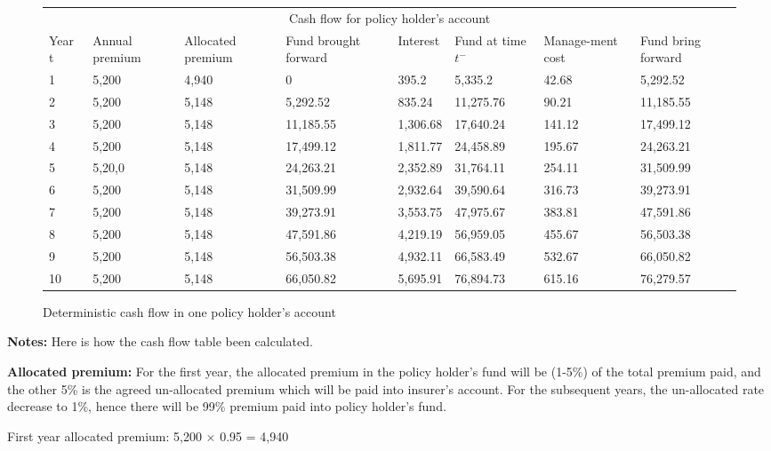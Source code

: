 \documentclass{report}
\begin{document}
\begin{figure}[H]
    \centering
\begin{tabular}{p{1cm} p{1.5cm} p{1.5cm} p{2cm} p{1.5cm} p{2cm} p{1.5cm} p{1.5cm} }
\toprule
\multicolumn{8}{c}{Cash flow for policy holder's account} \\
\cmidrule(r){3-7}

Year t & Annual premium & Allocated premium & Fund brought forward & Interest & Fund at time $t^-$ & Manage-ment cost & Fund bring forward \\
\midrule
1	&5,200	&4,940	&0&	395.2	&5,335.2	&42.68	&5,292.52\\
2	&5,200	&5,148	&5,292.52	 &   835.24	&11,275.76 &	90.21	&11,185.55\\
3	&5,200	&5,148	&11,185.55&  1,306.68	&17,640.24	&141.12  &17,499.12\\
4&	5,200	&5,148	&17,499.12&  1,811.77&	24,458.89	&    195.67       &24,263.21\\
5&	5,20,0	&5,148&	24,263.21	&    2,352.89&	31,764.11	&   254.11	&31,509.99\\
6&	5,200	&5,148&	31,509.99	&   2,932.64&	39,590.64	&   316.73	&39,273.91\\
7&	5,200	&5,148&	39,273.91	&   3,553.75&	47,975.67	&   383.81	&47,591.86\\
8&	5,200	&5,148&	47,591.86	&   4,219.19&	56,959.05	&  455.67	    &56,503.38\\
9&	5,200	&5,148&	56,503.38	&   4,932.11&	66,583.49	&  532.67 	&66,050.82\\
10&	5,200	&5,148	&66,050.82	&5,695.91	&76,894.73	&615.16	&76,279.57\\
\bottomrule
\end{tabular}
\label{determ-PHcashflow}
\caption{Deterministic cash flow in one policy holder's account}
\end{figure}




\textbf{Notes:} Here is how the cash flow table been calculated.

\textbf{Allocated premium:} For the first year, the allocated premium in the policy holder's fund will be (1-5\%) of the total premium paid, and the other 5\% is the agreed un-allocated premium which will be paid into insurer's account. For the subsequent years, the un-allocated rate decrease to 1\%, hence there will be 99\% premium paid into policy holder's fund.


First year allocated premium:                5,200 $\times$ 0.95 = 4,940
\end{document}
